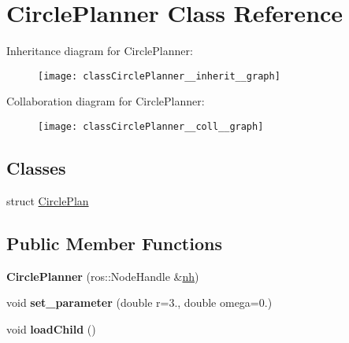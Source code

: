\hypertarget{classCirclePlanner}{}\section{Circle\+Planner Class Reference}
\label{classCirclePlanner}


Inheritance diagram for Circle\+Planner\+:\nopagebreak
\begin{figure}[H]
\begin{center}
\leavevmode
\texttt{[image: classCirclePlanner\_\_inherit\_\_graph]}
\end{center}
\end{figure}


Collaboration diagram for Circle\+Planner\+:\nopagebreak
\begin{figure}[H]
\begin{center}
\leavevmode
\texttt{[image: classCirclePlanner\_\_coll\_\_graph]}
\end{center}
\end{figure}
\subsection*{Classes}
\begin{DoxyCompactItemize}
\item 
struct \hyperlink{structCirclePlanner_1_1CirclePlan}{Circle\+Plan}
\end{DoxyCompactItemize}
\subsection*{Public Member Functions}
\begin{DoxyCompactItemize}
\item 
{\bfseries Circle\+Planner} (ros\+::\+Node\+Handle \&\hyperlink{classPlanner_a9714d036f444a07ce90be8d135b9a40c}{nh})\hypertarget{classCirclePlanner_a33a27f97f5a1300d43c80b519fdfb3ef}{}\label{classCirclePlanner_a33a27f97f5a1300d43c80b519fdfb3ef}

\item 
void {\bfseries set\+\_\+parameter} (double r=3., double omega=0.)\hypertarget{classCirclePlanner_a21fef783d5f2252fd1b53d93e869fc65}{}\label{classCirclePlanner_a21fef783d5f2252fd1b53d93e869fc65}

\item 
void {\bfseries load\+Child} ()\hypertarget{classCirclePlanner_a91410cbd01ce10f48a10b754cc1f6fce}{}\label{classCirclePlanner_a91410cbd01ce10f48a10b754cc1f6fce}

\end{DoxyCompactItemize}

